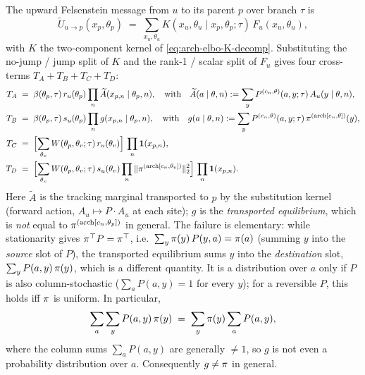 \iffalse

The upward Felsenstein message from $u$ to
its parent $p$ over branch $\tau$ is
\begin{equation}
\widetilde U_{u \to p}(x_p, \theta_p)
    \;=\;
    \sum_{x_u, \theta_u} K(x_u, \theta_u \mid x_p, \theta_p; \tau)
        \,F_u(x_u, \theta_u),
    \label{eq:arch-mmedge-exact-U}
\end{equation}
with $K$ the two-component kernel of \eqref{eq:arch-elbo-K-decomp}.
Substituting the no-jump / jump split of $K$ and the rank-1 / scalar
split of $F_u$ gives four cross-terms $T_A + T_B + T_C + T_D$:
\begin{align}
T_A &\;=\; \beta(\theta_p, \tau)\,r_u(\theta_p) \prod_n
    \widetilde A(x_{p,n} \mid \theta_p, n),
    \quad\text{with}\quad
    \widetilde A(a \mid \theta, n) := \sum_y P^{(c_n, \theta)}(a, y; \tau)\, A_u(y \mid \theta, n),
    \label{eq:arch-mmedge-TA} \\
T_B &\;=\; \beta(\theta_p, \tau)\,s_u(\theta_p) \prod_n
    g(x_{p,n} \mid \theta_p, n),
    \quad\text{with}\quad
    g(a \mid \theta, n) := \sum_y P^{(c_n, \theta)}(a, y; \tau)\, \pi^{(\mathrm{arch}[c_n, \theta])}(y),
    \label{eq:arch-mmedge-TB} \\
T_C &\;=\; \Bigl[\sum_{\theta_v} W(\theta_p, \theta_v; \tau)\, r_u(\theta_v)\Bigr]\, \prod_n \mathbf{1}(x_{p,n}),
    \label{eq:arch-mmedge-TC} \\
T_D &\;=\; \Bigl[\sum_{\theta_v} W(\theta_p, \theta_v; \tau)\, s_u(\theta_v)
    \prod_n \| \pi^{(\mathrm{arch}[c_n, \theta_v])}\|_2^2\Bigr]\, \prod_n \mathbf{1}(x_{p,n}).
    \label{eq:arch-mmedge-TD}
\end{align}
Here $\widetilde A$ is the tracking marginal transported to $p$ by the
substitution kernel (forward action, $A_u \mapsto P \cdot A_u$ at each
site); $g$ is the \emph{transported equilibrium}, which is \emph{not}
equal to $\pi^{(\mathrm{arch}[c_n, \theta_p])}$ in general. The failure is
elementary: while stationarity gives $\pi^\top P = \pi^\top$, i.e.\
$\sum_y \pi(y)\,P(y, a) = \pi(a)$ (summing $y$ into the
\emph{source} slot of $P$), the transported equilibrium sums $y$ into
the \emph{destination} slot, $\sum_y P(a, y)\,\pi(y)$, which is a
different quantity. It is a distribution over $a$ only if $P$ is also
column-stochastic ($\sum_a P(a, y) = 1$ for every $y$); for a
reversible $P$, this holds iff $\pi$ is uniform. In particular,
\begin{equation}
\sum_a\sum_y P(a, y)\,\pi(y)
    \;=\; \sum_y \pi(y) \sum_a P(a, y),
    \label{eq:arch-mmedge-g-failure}
\end{equation}
where the column sums $\sum_a P(a, y)$ are generally $\neq 1$, so $g$
is not even a probability distribution over $a$. Consequently
$g \neq \pi$ in general.

